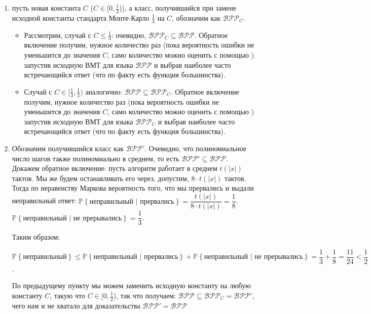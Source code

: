 \documentclass[a4paper,12pt]{article}
\newcommand{\prob}[1]{\mathbb{P}\left\{#1\right\}}
\begin{document}
\begin{solution}
	\begin{enumerate}
		\item пусть новая константа $C$ ($C \in [0, \frac{1}{2}$)), а класс, получившийся при замене исходной константы стандарта Монте-Карло $\frac13$ на $C$, обозначим как $\mathcal{BPP}_C$.
		
		\begin{itemize}
			\item Рассмотрим, случай с  $C \le \frac13$: очевидно, $\mathcal{BPP}_C \subseteq \mathcal{BPP}$. Обратное включение получим, нужное количество раз (пока вероятность ошибки не уменьшится до значения $C$, само количество можно оценить с помощью ) запустив исходную ВМТ для языка $\mathcal{BPP}$ и выбрав наиболее часто встречающийся ответ (что по факту есть функция большинства).
			
			\item Случай с  $C \in [\frac13, \frac{1}{2})$ аналогично: $\mathcal{BPP} \subseteq \mathcal{BPP}_C$. Обратное включение получим, нужное количество раз (пока вероятность ошибки не уменьшится до значения $C$, само количество можно оценить с помощью ) запустив исходную ВМТ для языка $\mathcal{BPP}_C$ и выбрав наиболее часто встречающийся ответ (что по факту есть функция большинства).
		\end{itemize}
	
	\item Обозначим получившийся класс как $\mathcal{BPP}'$. Очевидно, что полиномиальное число шагов также полиномиально в среднем, то есть $\mathcal{BPP}' \subseteq \mathcal{BPP}$. Докажем обратное включение: пусть алгоритм работает в среднем $t(|x|)$ тактов. Мы же будем останавливать его через, допустим, $8 \cdot t(|x|)$ тактов. Тогда по неравенству Маркова вероятность того, что мы прервались и выдали неправильный ответ: $\prob{\text{неправильный | прервались}} = \dfrac{t(|x|)}{8 \cdot t(|x|)} = \dfrac{1}{8}$.
	$\prob{\text{неправильный | не прерывались}} = \dfrac{1}{3}$.
	
	Таким образом:
	
	$\prob{\text{неправильный}} \le \prob{\text{неправильный | прервались}} + \prob{\text{неправильный | не прерывались}} = \dfrac{1}{3} + \dfrac{1}{8} = \dfrac{11}{24} < \dfrac12$.
	
	По предыдущему пункту мы можем заменить исходную константу на любую константу $C$, такую что $C \in [0, \frac{1}{2}$), так что получаем: $\mathcal{BPP} \subseteq \mathcal{BPP}_C = \mathcal{BPP}'$, чего нам и не хватало для доказательства $\mathcal{BPP}' = \mathcal{BPP}$
	
	\end{enumerate}
\end{solution}
\end{document}
